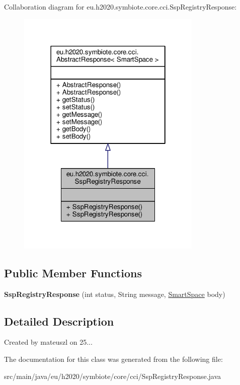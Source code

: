 Collaboration diagram for eu.\+h2020.\+symbiote.\+core.\+cci.\+Ssp\+Registry\+Response\+:\nopagebreak
\begin{figure}[H]
\begin{center}
\leavevmode
\includegraphics[width=250pt]{classeu_1_1h2020_1_1symbiote_1_1core_1_1cci_1_1SspRegistryResponse__coll__graph}
\end{center}
\end{figure}
\subsection*{Public Member Functions}
\begin{DoxyCompactItemize}
\item 
\mbox{\label{classeu_1_1h2020_1_1symbiote_1_1core_1_1cci_1_1SspRegistryResponse_a54da4b7875c0f03d6e277b9abbdbe1f5}} 
{\bfseries Ssp\+Registry\+Response} (int status, String message, \hyperlink{classeu_1_1h2020_1_1symbiote_1_1model_1_1mim_1_1SmartSpace}{Smart\+Space} body)
\end{DoxyCompactItemize}


\subsection{Detailed Description}
Created by mateuszl on 25... 

The documentation for this class was generated from the following file\+:\begin{DoxyCompactItemize}
\item 
src/main/java/eu/h2020/symbiote/core/cci/Ssp\+Registry\+Response.\+java\end{DoxyCompactItemize}
